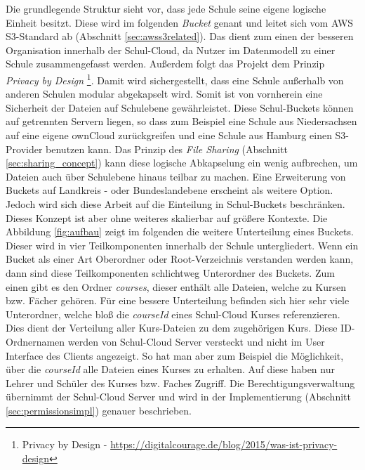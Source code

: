 Die grundlegende Struktur sieht vor, dass jede Schule seine eigene logische Einheit besitzt. Diese wird im folgenden \textit{Bucket} genant und leitet sich vom AWS S3-Standard ab (Abschnitt \ref{sec:awss3related}). Das dient zum einen der besseren Organisation innerhalb der Schul-Cloud, da Nutzer im Datenmodell zu einer Schule zusammengefasst werden. Außerdem folgt das Projekt dem Prinzip \textit{Privacy by Design} \footnote{Privacy by Design - \url{https://digitalcourage.de/blog/2015/was-ist-privacy-design} }. Damit wird sichergestellt, dass eine Schule außerhalb von anderen Schulen modular abgekapselt wird. Somit ist von vornherein  eine Sicherheit der Dateien auf Schulebene gewährleistet. Diese Schul-Buckets können auf getrennten Servern liegen, so dass zum Beispiel eine Schule aus Niedersachsen auf eine eigene ownCloud zurückgreifen und eine Schule aus Hamburg einen S3-Provider benutzen kann. Das Prinzip des \textit{File Sharing} (Abschnitt \ref{sec:sharing_concept}) kann diese logische Abkapselung ein wenig aufbrechen, um Dateien auch über Schulebene hinaus teilbar zu machen. Eine Erweiterung von Buckets auf Landkreis - oder Bundeslandebene erscheint als weitere Option. Jedoch wird sich diese Arbeit auf die Einteilung in Schul-Buckets beschränken. Dieses Konzept ist aber ohne weiteres skalierbar auf größere Kontexte.  Die Abbildung \ref{fig:aufbau} zeigt im folgenden die weitere Unterteilung eines Buckets. Dieser wird in vier Teilkomponenten innerhalb der Schule  untergliedert. Wenn ein Bucket als einer Art Oberordner oder Root-Verzeichnis verstanden werden kann, dann sind diese Teilkomponenten schlichtweg Unterordner des Buckets. Zum einen gibt es den Ordner \textit{courses}, dieser enthält alle Dateien, welche zu Kursen bzw. Fächer gehören. Für eine bessere Unterteilung befinden sich hier sehr viele Unterordner, welche bloß die \textit{courseId} eines Schul-Cloud Kurses referenzieren. Dies dient der Verteilung aller Kurs-Dateien zu dem zugehörigen Kurs. Diese ID-Ordnernamen werden von Schul-Cloud Server versteckt und nicht im User Interface des  Clients angezeigt. So hat man aber zum Beispiel die Möglichkeit, über die \textit{courseId} alle Dateien eines Kurses zu erhalten. Auf diese haben nur Lehrer und Schüler des Kurses bzw. Faches Zugriff. Die Berechtigungsverwaltung übernimmt der Schul-Cloud Server und wird in der Implementierung (Abschnitt \ref{sec:permissionsimpl}) genauer beschrieben. \\

